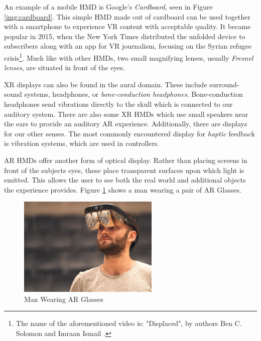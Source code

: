 An example of a mobile HMD is Google's \textit{Cardboard}, seen in Figure \ref{img:cardboard}. This simple HMD made out of cardboard can be used together with a smartphone to experience VR content with acceptable quality. It became popular in 2015, when the New York Times distributed the unfolded device to subscribers along with an app for VR journalism, focusing on the Syrian refugee crisis\footnote{The name of the aforementioned video is: "Displaced", by authors Ben C. Solomon and Imraan Ismail \cite{TheDispl63online}.}. Much like with other HMDs, two small magnifying lenses, usually \textit{Fresnel lenses}, are situated in front of the eyes. 

XR displays can also be found in the aural domain. These include surround-sound systems, headphones, or \textit{bone-conduction headphones}. Bone-conduction headphones send vibrations directly to the skull which is connected to our auditory system. There are also some XR HMDs which use small speakers near the ears to provide an auditory AR experience. Additionally, there are displays for our other senses. The most commonly encountered display for \textit{haptic} feedback is vibration systems, which are used in controllers. 

AR HMDs offer another form of optical display. Rather than placing screens in front of the subjects eyes, these place transparent surfaces upon which light is emitted. This allows the user to see both the real world and additional objects the experience provides. Figure \ref{img:ar-glasses} shows a man wearing a pair of AR Glasses. 

\begin{figure}[ht!]%
\centering
\includegraphics[width=0.6\textwidth]{img/ar-glasses.jpg} 
\caption{Man Wearing AR Glasses \cite{FileWear23online}}
\label{img:ar-glasses}
\end{figure}

